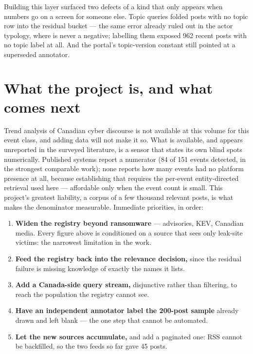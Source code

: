 \documentclass[11pt]{article}
\begin{document}
\begin{warnbox}
Building this layer surfaced two defects of a kind that only appears when
numbers go on a screen for someone else. Topic queries folded posts with no
topic row into the residual  bucket --- the same error already
ruled out in the actor typology, where  is never a negative;
labelling them  exposed 962 recent posts with no topic label
at all. And the portal's topic-version constant still pointed at a superseded
annotator.
\end{warnbox}

\section*{\color{accent}What the project is, and what comes next}

Trend analysis of Canadian cyber discourse is not available at this volume for
this event class, and adding data will not make it so. What is available, and
appears unreported in the surveyed literature, is a sensor that states its own
blind spots numerically. Published systems report a numerator (84 of 151 events
detected, in the strongest comparable work); none reports how many events had
no platform presence at all, because establishing that requires the per-event
entity-directed retrieval used here --- affordable only when the event count is
small. This project's greatest liability, a corpus of a few thousand relevant
posts, is what makes the denominator measurable. Immediate priorities, in
order:

\begin{enumerate}[leftmargin=1.5em,itemsep=1pt]
\item \textbf{Widen the registry beyond ransomware} --- advisories, KEV,
Canadian media. Every figure above is conditioned on a source that sees only
leak-site victims: the narrowest limitation in the work.
\item \textbf{Feed the registry back into the relevance decision,} since the
residual failure is missing knowledge of exactly the names it lists.
\item \textbf{Add a Canada-side query stream,} disjunctive rather than
filtering, to reach the population the registry cannot see.
\item \textbf{Have an independent annotator label the 200-post sample} already
drawn and left blank --- the one step that cannot be automated.
\item \textbf{Let the new sources accumulate,} and add a paginated one: RSS
cannot be backfilled, so the two feeds so far gave 45 posts.
\end{enumerate}

\smallskip
{}
\end{document}
